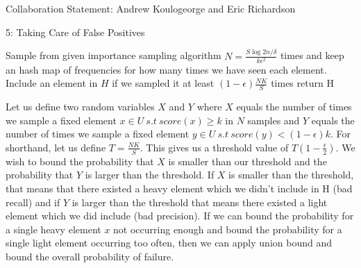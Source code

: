 \documentclass[12pt]{article}
\begin{document}

Collaboration Statement: Andrew Koulogeorge and Eric Richardson 

\begin{problem}{5: Taking Care of False Positives}
\end{problem}

\begin{solution}

\begin{answerbox}
\begin{algorithmic}[1]
\State Sample from given importance sampling algorithm $N = \frac{S\log{2n/\delta}}{k\epsilon^2}$ times and keep an hash map of frequencies for how many times we have seen each element. 
\State Include an element in $H$ if we sampled it at least $(1-\epsilon)\frac{NK}{S}$ times
\State return H
\EndProcedure
\end{algorithmic}
\end{answerbox}
Let us define two random variables $X$ and $Y$ where $X$ equals the number of times we sample a fixed element $x \in U~ s.t~ score(x) \geq k$ in $N$ samples and $Y$ equals the number of times we sample a fixed element $y \in U~ s.t ~score(y) < (1-\epsilon)k$. For shorthand, let us define $T = \frac{NK}{S}$. This gives us a threshold value of $T(1-\frac{\epsilon}{2})$. We wish to bound the probability that $X$ is smaller than our threshold and the probability that $Y$ is larger than the threshold. If $X$ is smaller than the threshold, that means that there existed a heavy element which we didn't include in H (bad recall) and if $Y$ is larger than the threshold that means there existed a light element which we did include (bad precision). If we can bound the probability for a single heavy element $x$ not occurring enough and bound the probability for a single light element occurring too often, then we can apply union bound and bound the overall probability of failure. \\


\end{solution}
\end{document}

